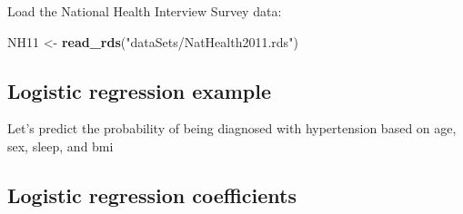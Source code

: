 \documentclass[]{book}
\newenvironment{Shaded}{\begin{snugshade}}{\end{snugshade}}
\newcommand{\KeywordTok}[1]{\textcolor[rgb]{0.13,0.29,0.53}{\textbf{#1}}}
\newcommand{\DataTypeTok}[1]{\textcolor[rgb]{0.13,0.29,0.53}{#1}}
\newcommand{\StringTok}[1]{\textcolor[rgb]{0.31,0.60,0.02}{#1}}
\newcommand{\CommentTok}[1]{\textcolor[rgb]{0.56,0.35,0.01}{\textit{#1}}}
\newcommand{\OperatorTok}[1]{\textcolor[rgb]{0.81,0.36,0.00}{\textbf{#1}}}
\newcommand{\NormalTok}[1]{#1}
\begin{document}
Load the National Health Interview Survey data:

\begin{Shaded}
\begin{Highlighting}[]
\NormalTok{  NH11 <-}\StringTok{ }\KeywordTok{read_rds}\NormalTok{(}\StringTok{"dataSets/NatHealth2011.rds"}\NormalTok{)}
\end{Highlighting}
\end{Shaded}

\subsection{Logistic regression
example}\label{logistic-regression-example}

Let's predict the probability of being diagnosed with hypertension based
on age, sex, sleep, and bmi

\begin{Shaded}
\end{Shaded}

\subsection{Logistic regression
coefficients}\label{logistic-regression-coefficients}
\end{document}
